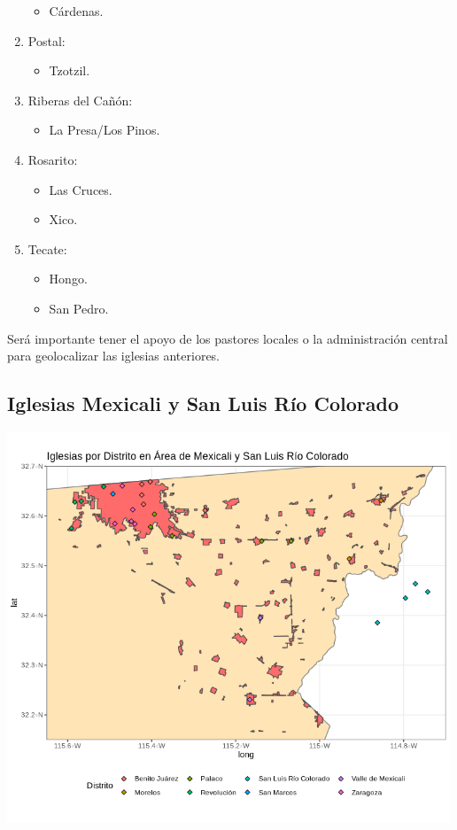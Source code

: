 \documentclass[]{article}
\providecommand{\tightlist}{%
  \setlength{\itemsep}{0pt}\setlength{\parskip}{0pt}}
\begin{document}
\begin{enumerate}
  \begin{itemize}
  \tightlist
  \item
    Cárdenas.
  \end{itemize}
\item
  Postal:

  \begin{itemize}
  \tightlist
  \item
    Tzotzil.
  \end{itemize}
\item
  Riberas del Cañón:

  \begin{itemize}
  \tightlist
  \item
    La Presa/Los Pinos.
  \end{itemize}
\item
  Rosarito:

  \begin{itemize}
  \tightlist
  \item
    Las Cruces.
  \item
    Xico.
  \end{itemize}
\item
  Tecate:

  \begin{itemize}
  \tightlist
  \item
    Hongo.
  \item
    San Pedro.
  \end{itemize}
\end{enumerate}

Será importante tener el apoyo de los pastores locales o la
administración central para geolocalizar las iglesias anteriores.

\subsection{Iglesias Mexicali y San Luis Río
Colorado}\label{iglesias-mexicali-y-san-luis-ruxedo-colorado}

\includegraphics[width=5.20833in]{img/iglesiasMexicali.png}
\end{document}
